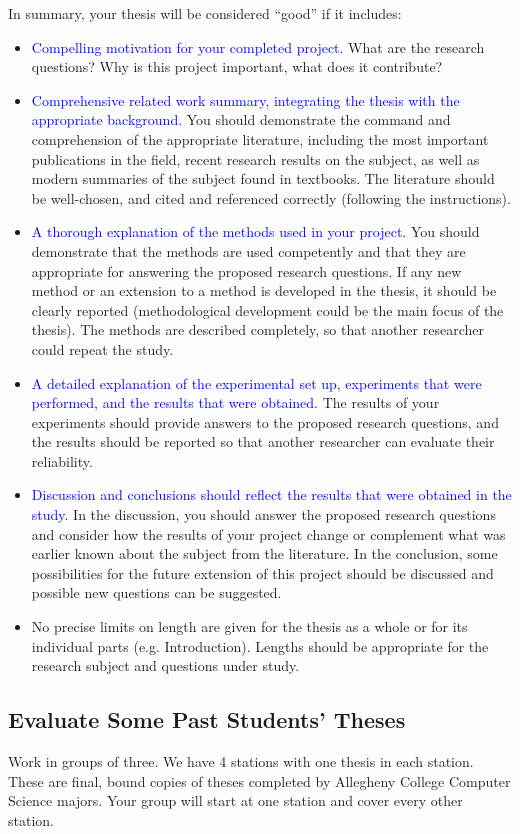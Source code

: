 In summary, your thesis will be considered ``good'' if it includes:
\begin{itemize}
\item
\textcolor{blue}{Compelling motivation for your completed project.} What are the research questions? Why is this project important, what does it contribute?
\item
\textcolor{blue}{Comprehensive related work summary, integrating the thesis with the appropriate background.}
You should demonstrate the command and comprehension of the appropriate literature, including the most important publications in the field, recent research results on the subject, as well as modern summaries of the subject found in textbooks. The literature should be well-chosen, and cited and referenced correctly (following the instructions).
\item
\textcolor{blue}{A thorough explanation of the methods used in your project.}
You should demonstrate that the methods are used competently and that they are appropriate for answering the proposed research questions. If any new method or an extension to a method is developed in the thesis, it should be clearly reported (methodological development could be the main focus of the thesis). The methods are described completely, so that another researcher could repeat the study. 
\item 
\textcolor{blue}{A detailed explanation of the experimental set up, experiments that were performed, and the results that were obtained.}
The results of your experiments should provide answers to the proposed research questions, and the results should be reported so that another researcher can evaluate their reliability.
\item
\textcolor{blue}{Discussion and conclusions should reflect the results that were obtained in the study.} In the discussion, you should answer the proposed research questions and consider how the results of your project change or complement what was earlier known about the subject from the literature. In the conclusion, some possibilities for the future extension of this project should be discussed and possible new questions can be suggested. 
\item 
No precise limits on length are given for the thesis as a whole or for its individual parts (e.g. Introduction). Lengths should be appropriate for the research subject and questions under study.
\end{itemize}

\subsection*{Evaluate Some Past Students' Theses}
Work in groups of three. We have 4 stations with one thesis in each station. 
These are final, bound copies of theses completed by Allegheny College Computer 
Science majors. Your group will start at one station and cover every other station.
 
